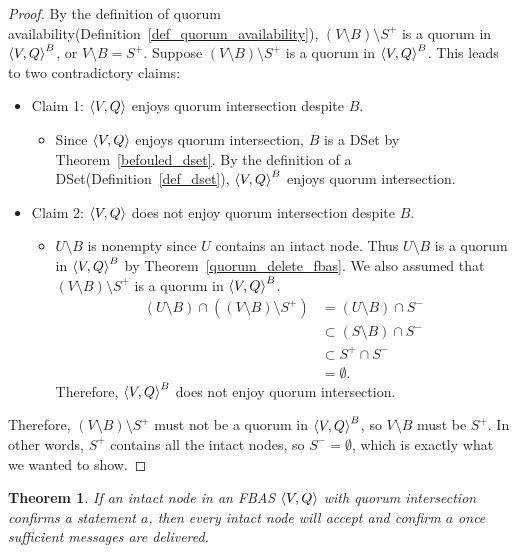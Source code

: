 \documentclass[12pt, psamsfonts]{amsart}
\newtheorem{thm}{Theorem}[subsection]
\theoremstyle{definition}
\theoremstyle{remark}
\numberwithin{equation}{subsection}
\begin{document}
\begin{proof}
    By the definition of quorum availability(Definition~\ref{def_quorum_availability}), $(V \setminus B) \setminus S^{+}$ is a quorum in $\ev{V, Q}^B$, or $V \setminus B = S^{+}$.
    Suppose $(V \setminus B) \setminus S^{+}$ is a quorum in $\ev{V, Q}^B$.
    This leads to two contradictory claims:
    \begin{itemize}
        \item
            Claim 1: $\ev{V, Q}$ enjoys quorum intersection despite $B$.
            \begin{itemize}
                \item
                    Since $\ev{V, Q}$ enjoys quorum intersection, $B$ is a DSet by Theorem~\ref{befouled_dset}.
                    By the definition of a DSet(Definition~\ref{def_dset}), $\ev{V, Q}^B$ enjoys quorum intersection.
            \end{itemize}
        \item
            Claim 2: $\ev{V, Q}$ does not enjoy quorum intersection despite $B$.
            \begin{itemize}
                \item
                    $U \setminus B$ is nonempty since $U$ contains an intact node.
                    Thus $U \setminus B$ is a quorum in $\ev{V, Q}^B$ by Theorem~\ref{quorum_delete_fbas}.
                    We also assumed that $(V \setminus B) \setminus S^{+}$ is a quorum in $\ev{V, Q}^B$.
                    \begin{align*}
                        (U \setminus B) \cap ((V \setminus B) \setminus S^{+})
                            &= (U \setminus B) \cap S^{-} \\
                            &\subset (S \setminus B) \cap S^{-} \\
                            &\subset S^{+} \cap S^{-} \\
                            &= \emptyset.
                    \end{align*}
                    Therefore, $\ev{V, Q}^B$ does not enjoy quorum intersection.
            \end{itemize}
    \end{itemize}
    Therefore, $(V \setminus B) \setminus S^{+}$ must not be a quorum in $\ev{V, Q}^B$, so $V \setminus B$ must be $S^{+}$.
    In other words, $S^{+}$ contains all the intact nodes, so $S^{-} = \emptyset$, which is exactly what we wanted to show.
\end{proof}

\begin{thm}\label{all_intact_nodes_accept_confirm_same_things}
    If an intact node in an FBAS $\ev{V, Q}$ with quorum intersection confirms a statement $a$, then every intact node will accept and confirm $a$ once sufficient messages are delivered.
\end{thm}
\end{document}
